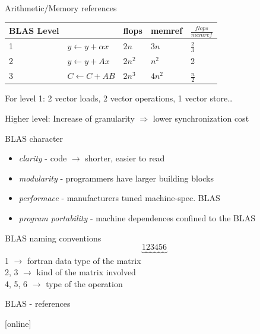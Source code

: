 	\begin{frame}{Arithmetic/Memory references}
		\begin{tabular}{ | l | l | l | l | l |}
		\hline
		BLAS Level & 		& flops 	&memref 	& $\frac{flops}{mem ref}$ \\ \hline
		1 & $y \leftarrow y + \alpha x$ 	& $2n$ 	& $3n$ 	& $\frac{2}{3} $ \\ \hline
		2 & $y \leftarrow y + Ax$ 		& $2n^2$ 	& $n^2$ 	& 2 			\\ \hline
		3 & $C \leftarrow C + AB$ 	& $2n^3$ 	& $4n^2$ 	& $\frac{n}{2}$ 	\\ \hline
		\end{tabular}
		
		For level 1: 2 vector loads, 2 vector operations, 1 vector store\dots 
		
		Higher level: Increase of granularity $\Rightarrow$ lower synchronization cost
	\end{frame}
	\begin{frame}{BLAS character}
		\begin{itemize}
			\item \textit{clarity} - code $\rightarrow$ shorter, easier to read
			\item \textit{modularity} - programmers have larger building blocks
			\item \textit{performace} - manufacturers tuned machine-spec. BLAS
			\item \textit{program portability} - machine dependences confined to the BLAS
		\end{itemize}
	\end{frame}
	\begin{frame}{BLAS naming conventions}
	\[
		\underbrace{1}_{} \underbrace{2}_{} \underbrace{3}_{} \underbrace{4}_{} \underbrace{5}_{} \underbrace{6}_{}
	\]
	1 $\rightarrow$ fortran data type of the matrix \\
	2, 3 $\rightarrow$ kind of the matrix involved \\
	4, 5, 6 $\rightarrow$ type of the operation
	\end{frame}
	\begin{frame}{BLAS - references}
		\begin{thebibliography}{9}
		\end{thebibliography}
	\end{frame}
	
